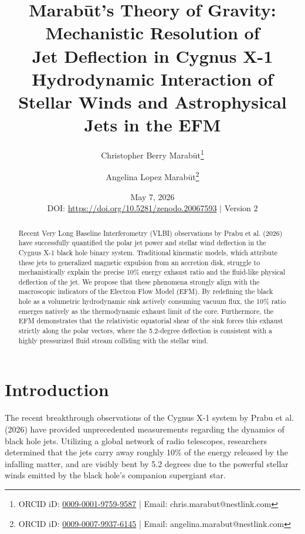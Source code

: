 \documentclass[11pt, a4paper]{article}
\title{\textbf{Marab\={u}t's Theory of Gravity: \\ Mechanistic Resolution of \\ Jet Deflection in Cygnus X-1} \\[1em] \large{Hydrodynamic Interaction of Stellar Winds and Astrophysical Jets in the EFM}}
\author[1]{Christopher Berry Marab\={u}t\thanks{ORCID iD: \href{https://orcid.org/0009-0001-9759-9587}{0009-0001-9759-9587} | Email: chris.marabut@nestlink.com}}
\author[1]{Angelina Lopez Marab\={u}t\thanks{ORCID iD: \href{https://orcid.org/0009-0007-9937-6145}{0009-0007-9937-6145} | Email: angelina.marabut@nestlink.com}}
\affil[1]{Independent Researchers}
\date{May 7, 2026 \\[1.5em] \small{DOI: \url{https://doi.org/10.5281/zenodo.20067593} $|$ Version 2}}
\begin{document}

\maketitle

\begin{abstract}
  Recent Very Long Baseline Interferometry (VLBI) observations by Prabu et al. (2026) have successfully quantified the polar jet power and stellar wind deflection in the Cygnus X-1 black hole binary system. Traditional kinematic models, which attribute these jets to generalized magnetic expulsion from an accretion disk, struggle to mechanistically explain the precise 10\% energy exhaust ratio and the fluid-like physical deflection of the jet. We propose that these phenomena strongly align with the macroscopic indicators of the Electron Flow Model (EFM). By redefining the black hole as a volumetric hydrodynamic sink actively consuming vacuum flux, the 10\% ratio emerges natively as the thermodynamic exhaust limit of the core. Furthermore, the EFM demonstrates that the relativistic equatorial shear of the sink forces this exhaust strictly along the polar vectors, where the 5.2-degree deflection is consistent with a highly pressurized fluid stream colliding with the stellar wind.
\end{abstract}

\section{Introduction}
The recent breakthrough observations of the Cygnus X-1 system by Prabu et al. (2026) \cite{prabu2026} have provided unprecedented measurements regarding the dynamics of black hole jets. Utilizing a global network of radio telescopes, researchers determined that the jets carry away roughly 10\% of the energy released by the infalling matter, and are visibly bent by 5.2 degrees due to the powerful stellar winds emitted by the black hole's companion supergiant star.
\end{document}

